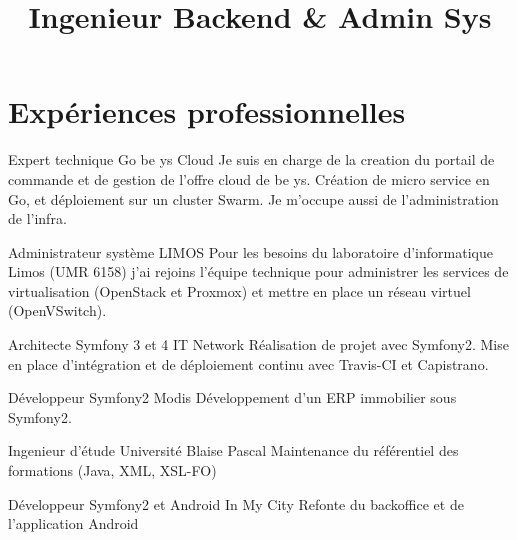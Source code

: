 \documentclass[11pt,a4paper]{moderncv}
\title{Ingenieur Backend \& Admin Sys}                               %
\begin{document}
    \maketitle
    \section{Expériences professionnelles}
        {Expert technique Go}
        {be ys Cloud}
        {}
        {}
        {
          \justify
          Je suis en charge de la creation du portail de commande et de gestion
          de l'offre cloud de be ys. Création de micro service en Go, et déploiement sur un cluster Swarm. Je m'occupe aussi de l'administration de l'infra.
        }

        {Administrateur système}
        {LIMOS}
        {}
        {}
        {
          \justify
          Pour les besoins du laboratoire d'informatique Limos (UMR 6158) j'ai rejoins l'équipe technique \newline{}
          pour administrer les services de virtualisation (OpenStack et Proxmox) et mettre en place un \newline{}
          réseau virtuel (OpenVSwitch).
        }

        {Architecte Symfony 3 et 4}
        {IT Network}
        {}
        {}
        {
          \justify
          Réalisation de projet avec Symfony2. Mise en place d'intégration et de déploiement continu avec\newline{}
          Travis-CI et Capistrano.
        }

        {
          Développeur Symfony2
        }
        {Modis}
        {}
        {}
        {Développement d'un ERP immobilier sous Symfony2.}

        {Ingenieur d'étude}
        {Université Blaise Pascal}
        {}
        {}
        {Maintenance du référentiel des formations (Java, XML, XSL-FO)}

        {Développeur Symfony2 et Android}
        {In My City}
        {}
        {}
        {Refonte du backoffice et de l'application Android}
\end{document}
